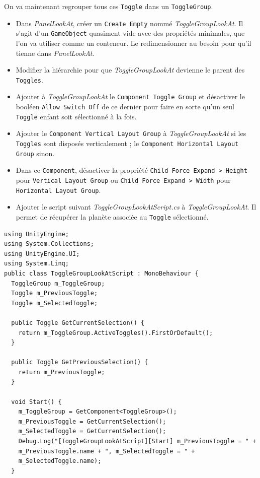 \documentclass[a4paper,10pt]{article}
\newenvironment{solution}%
{\begin{tcolorbox}[breakable,colback=red!5!white,colframe=red!75!black,title=Solution]}%
{\end{tcolorbox}}
\begin{document}
\begin{solution}
On va maintenant regrouper tous ces \texttt{Toggle} dans un \texttt{ToggleGroup}.
\begin{itemize}
	\item Dans \textit{PanelLookAt}, créer un \texttt{Create Empty} nommé \textit{ToggleGroupLookAt}. Il s'agit d'un \texttt{GameObject} quasiment vide avec des propriétés minimales, que l'on va utiliser comme un conteneur. Le redimensionner au besoin pour qu'il tienne dans  \textit{PanelLookAt}.
	\item Modifier la hiérarchie pour que \textit{ToggleGroupLookAt} devienne le parent des \texttt{Toggles}.
	\item Ajouter à \textit{ToggleGroupLookAt} le \texttt{Component Toggle Group} et désactiver le booléen \texttt{Allow Switch Off} de ce dernier pour faire en sorte qu'un seul \texttt{Toggle} enfant soit sélectionné à la fois.
	\item Ajouter le \texttt{Component Vertical Layout Group} à \textit{ToggleGroupLookAt} si les \texttt{Toggles} sont disposés verticalement ; le \texttt{Component Horizontal Layout Group} sinon.
	\item Dans ce \texttt{Component}, désactiver la propriété \texttt{Child Force Expand > Height} pour \texttt{Vertical Layout Group} ou \texttt{Child Force Expand > Width} pour \texttt{Horizontal Layout Group}.
	\item Ajouter le script suivant \textit{ToggleGroupLookAtScript.cs} à \textit{ToggleGroupLookAt}. Il permet de récupérer la planète associée au \texttt{Toggle} sélectionné.
\end{itemize}

\begin{lstlisting}
using UnityEngine;
using System.Collections;
using UnityEngine.UI;
using System.Linq;
public class ToggleGroupLookAtScript : MonoBehaviour {
  ToggleGroup m_ToggleGroup;
  Toggle m_PreviousToggle;
  Toggle m_SelectedToggle;
	
  public Toggle GetCurrentSelection() {
  	return m_ToggleGroup.ActiveToggles().FirstOrDefault();
  }
	
  public Toggle GetPreviousSelection() {
	return m_PreviousToggle;
  }
	
  void Start() {
	m_ToggleGroup = GetComponent<ToggleGroup>();
	m_PreviousToggle = GetCurrentSelection();
	m_SelectedToggle = GetCurrentSelection();
	Debug.Log("[ToggleGroupLookAtScript][Start] m_PreviousToggle = " +
	m_PreviousToggle.name + ", m_SelectedToggle = " +
	m_SelectedToggle.name);
  }
	

\end{lstlisting}
\end{solution}
\end{document}
